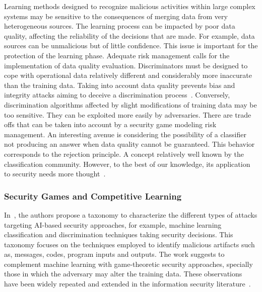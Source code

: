 \documentclass[letterpaper, 10pt, conference]{IEEEtran}
\begin{document}
Learning methods designed to recognize malicious activities within large complex systems may be sensitive to the consequences of merging data from very
heterogeneous sources. The learning process can be impacted by poor data quality, affecting the reliability of the  decisions that are made.
For example, data sources can be unmalicious but of
little confidence.
This issue is important for the protection of the learning phase.
Adequate risk management calls for the implementation of data quality evaluation. Discriminators must be designed to cope with operational data relatively different and considerably more inaccurate than the training data. Taking into account data quality prevents bias and
integrity attacks aiming to deceive a discrimination process~\cite{papernot2016distillation}.
Conversely, discrimination algorithms
affected by slight modifications of training data may be too
 sensitive. They can be exploited more easily by adversaries.
 There are trade offs that can be taken into account by a
security game modeling risk management. An interesting avenue is
considering the possibility of a classifier not producing an answer when data quality cannot be guaranteed.
This behavior corresponds to the rejection principle.
A concept relatively well known by the classification community.
However, to the best of our
knowledge, its application to security needs more thought~\cite{de2000reject}.

\subsubsection{Security Games and Competitive Learning}

In~\cite{barreno2010security}, the authors propose a
taxonomy to characterize the different types of attacks
targeting AI-based security approaches, for example, machine learning classification and discrimination techniques taking security decisions. This taxonomy focuses on the
techniques employed to identify malicious artifacts such as, messages, codes, program inputs and outputs.
The work suggests to complement machine learning with game-theoretic security approaches, specially those in which the
adversary may alter the training data. These observations have
been widely repeated and extended in the information security literature~\cite{papernot2016towards}.
\end{document}
